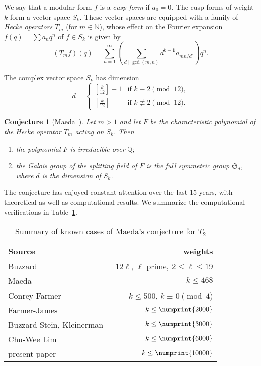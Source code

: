 \documentclass[11pt]{article}
\theoremstyle{plain}
\newtheorem{conjecture}[theorem]{Conjecture}
\theoremstyle{definition}
\theoremstyle{remark}
\numberwithin{equation}{section}
\numberwithin{table}{section}
\newcommand{\QQ}{\mathbb{Q}}
\newcommand{\NN}{\mathbb{N}}
\renewcommand{\SS}{\mathfrak{S}}
\newcommand{\bound}{\numprint{10000}}
\begin{document}
We say that a modular form $f$ is a \emph{cusp form} if $a_0=0$.  The cusp
forms of weight $k$ form a vector space $S_k$.  These vector spaces are
equipped with a family of \emph{Hecke operators} $T_m$ (for $m\in\NN$), whose
effect on the Fourier expansion $f(q)=\sum a_nq^n$ of $f\in S_k$ is given by
\begin{equation*}
  (T_m f)(q)=\sum_{n=1}^\infty \left(\sum_{d\mid\gcd(m,n)}d^{k-1}a_{mn/d^2}\right)q^n.
\end{equation*}

The complex vector space $S_k$ has dimension 
\begin{equation*}
  d=\begin{cases}
    \left[\frac{k}{12}\right]-1 & \text{if }k\equiv 2\pmod{12},\\
    \left[\frac{k}{12}\right] & \text{if }k\not\equiv 2\pmod{12}.
  \end{cases}
\end{equation*}

\begin{conjecture}[Maeda~\cite{Maeda}]
  Let $m>1$ and 
  let $F$ be the characteristic polynomial of the Hecke operator $T_m$ acting
  on $S_k$.  Then 
  \begin{enumerate}
    \item the polynomial $F$ is irreducible over $\QQ$;
    \item the Galois group of the splitting field of $F$ is the full symmetric
      group $\SS_d$, where $d$ is the dimension of $S_k$.
  \end{enumerate}
\end{conjecture}

The conjecture has enjoyed constant attention over the last 15 years, with
theoretical as well as computational results.  We summarize the computational
verifications in Table~\ref{tbl:known}.

\begin{table}[h]
  \begin{center}
\begin{tabular}{l|r}
  Source & weights\\ \hline
  Buzzard~\cite{Buzzard} & $12\ell$, $\ell$ prime, $2\leq\ell\leq 19$ \\
  Maeda~\cite{Maeda} & $k\leq 468$ \\
  Conrey-Farmer~\cite{ConreyFarmer} & $k\leq 500$, $k\equiv 0\pmod 4$  \\
  Farmer-James~\cite{FarmerJames} & $k\leq \numprint{2000}$  \\
  Buzzard-Stein, Kleinerman~\cite{Kleinerman} & $k\leq\numprint{3000}$ \\
  Chu-Wee Lim~\cite{Lim} & $k\leq\numprint{6000}$ \\
  present paper & $k\leq\bound$  \\
\end{tabular}
\end{center}
\caption{Summary of known cases of Maeda's conjecture for $T_2$}
\label{tbl:known}
\end{table}
\end{document}

